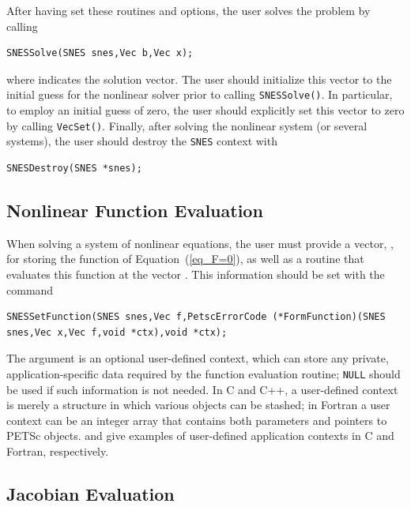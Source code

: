 After having set these routines and options, the user
solves the problem by calling
\begin{lstlisting}
SNESSolve(SNES snes,Vec b,Vec x);
\end{lstlisting}
where  indicates the solution vector. The user should
initialize this vector to the initial guess for the nonlinear solver
prior to calling \lstinline{SNESSolve()}.  In particular, to employ an
initial guess of zero, the user should explicitly set this vector to
zero by calling \lstinline{VecSet()}.  Finally, after solving the nonlinear
system (or several systems), the user should destroy the \lstinline{SNES} context
with
\begin{lstlisting}
SNESDestroy(SNES *snes);
\end{lstlisting}

\subsection{Nonlinear Function Evaluation}
\label{sec_snesfunction}

When solving a system of nonlinear equations, the user must provide
a vector, , for storing the function of
Equation~(\ref{eq_F=0}), as well as a routine that evaluates this
function at the vector .  This information should be set with
the command
\begin{lstlisting}
SNESSetFunction(SNES snes,Vec f,PetscErrorCode (*FormFunction)(SNES snes,Vec x,Vec f,void *ctx),void *ctx);
\end{lstlisting}
The argument  is an optional user-defined context, which can
store any private, application-specific data required by the
function evaluation routine; \lstinline{NULL} should be used if such information
is not needed.  In C and C++, a user-defined context is merely a
structure in which various objects can be stashed; in Fortran a user
context can be an integer array that contains both parameters and
pointers to PETSc objects. \href{https://www.mcs.anl.gov/petsc/petsc-current/src/snes/examples/tutorials/ex5.c.html}{} and
\href{https://www.mcs.anl.gov/petsc/petsc-current/src/snes/examples/tutorials/ex5f.F.html}{} give examples of user-defined
application contexts in C and Fortran, respectively.

\subsection{Jacobian Evaluation}
\label{sec_snesjacobian}

